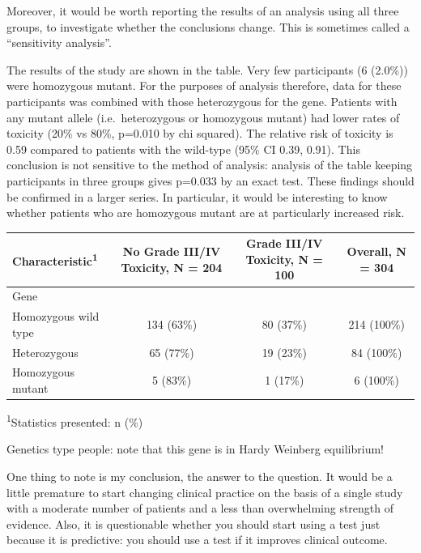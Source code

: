 \documentclass[]{book}
\begin{document}
Moreover, it would be worth reporting the results of an analysis using all three groups, to investigate whether the conclusions change. This is sometimes called a ``sensitivity analysis''.

The results of the study are shown in the table. Very few participants (6 (2.0\%)) were homozygous mutant. For the purposes of analysis therefore, data for these participants was combined with those heterozygous for the gene. Patients with any mutant allele (i.e.~heterozygous or homozygous mutant) had lower rates of toxicity (20\% vs 80\%, p=0.010 by chi squared). The relative risk of toxicity is 0.59 compared to patients with the wild-type (95\% CI 0.39, 0.91). This conclusion is not sensitive to the method of analysis: analysis of the table keeping participants in three groups gives p=0.033 by an exact test. These findings should be confirmed in a larger series. In particular, it would be interesting to know whether patients who are homozygous mutant are at particularly increased risk.

\captionsetup[table]{labelformat=empty,skip=1pt}
\begin{longtable}{lccc}
\toprule
\textbf{Characteristic}\textsuperscript{1} & \textbf{No Grade III/IV Toxicity}, N = 204 & \textbf{Grade III/IV Toxicity}, N = 100 & \textbf{Overall}, N = 304 \\ 
\midrule
Gene &  &  &  \\ 
Homozygous wild type & 134 (63\%) & 80 (37\%) & 214 (100\%) \\ 
Heterozygous & 65 (77\%) & 19 (23\%) & 84 (100\%) \\ 
Homozygous mutant & 5 (83\%) & 1 (17\%) & 6 (100\%) \\ 
\bottomrule
\end{longtable}
\vspace{-5mm}
\begin{minipage}{\linewidth}
\textsuperscript{1}Statistics presented: n (\%) \\ 
\end{minipage}

Genetics type people: note that this gene is in Hardy Weinberg equilibrium!

One thing to note is my conclusion, the answer to the question. It would be a little premature to start changing clinical practice on the basis of a single study with a moderate number of patients and a less than overwhelming strength of evidence. Also, it is questionable whether you should start using a test just because it is predictive: you should use a test if it improves clinical outcome.
\end{document}
